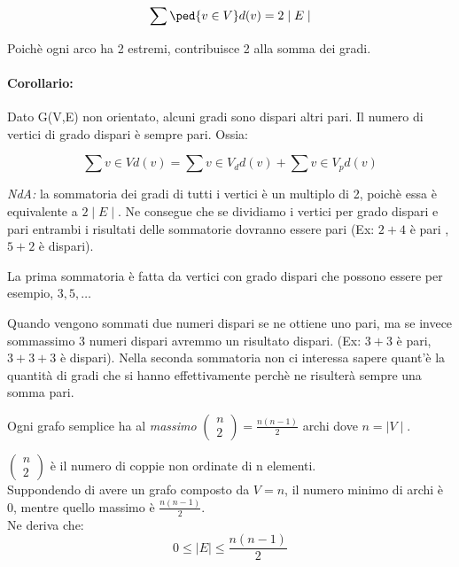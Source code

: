 \documentclass[12pt,a4paper]{article}
\begin{document}
    \begin{equation}
        \sum \ped{v \in V} d(v) = 2 \mid E \mid 
    \end{equation}

    Poichè ogni arco ha 2 estremi, contribuisce 2 alla somma dei gradi. \\
    \paragraph{Corollario:} Dato G(V,E) non orientato, alcuni gradi sono dispari altri pari. Il numero di vertici di grado dispari è sempre pari. Ossia:

    \begin{equation}
    \sum{v \in V} d(v) = \sum{v \in V_d} d(v) + \sum{v \in V_p} d(v)
    \end{equation}

    \textit{NdA:} la sommatoria dei gradi di tutti i vertici è un multiplo di 2, poichè essa è equivalente a \( 2 \mid E \mid\). Ne consegue che se dividiamo i vertici per grado dispari e pari entrambi i risultati delle sommatorie dovranno essere pari (Ex: $2 +4$ è pari , $5+2$ è dispari). \par
    La prima sommatoria è fatta da vertici con grado dispari che possono essere per esempio, $3,5, \dots$ \par Quando vengono sommati due numeri dispari se ne ottiene uno pari, ma se invece sommassimo 3 numeri dispari avremmo un risultato dispari. (Ex: $3+3$ è pari, $3+3+3$ è dispari). Nella seconda sommatoria non ci interessa sapere quant'è la quantità di gradi che si hanno effettivamente perchè ne risulterà sempre una somma pari.

    Ogni grafo semplice ha al \emph{massimo} \( \left( \begin{array}{c} n \\ 2 \end{array} \right) = \frac{n(n-1)}{2} \) archi dove \( n = \mid V \mid \). \par
    \( \left( \begin{array}{c} n \\ 2 \end{array} \right) \) è il numero di coppie non ordinate di n elementi. \\
    Suppondendo di avere un grafo composto da \(V = n\), il numero minimo di archi è 0, mentre quello massimo è $\frac{n(n-1)}{2}$.\\
    Ne deriva che:
    \begin{equation}
    0 \leq \mid E \mid \leq \frac{n(n-1)}{2}
    \end{equation}
\end{document}
